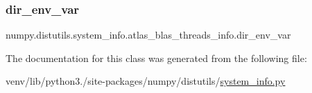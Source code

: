 \subsubsection{\texorpdfstring{dir\+\_\+env\+\_\+var}{dir\_env\_var}}
{\footnotesize\ttfamily numpy.\+distutils.\+system\+\_\+info.\+atlas\+\_\+blas\+\_\+threads\+\_\+info.\+dir\+\_\+env\+\_\+var\hspace{0.3cm}{\ttfamily [static]}}



The documentation for this class was generated from the following file\+:\begin{DoxyCompactItemize}
\item 
venv/lib/python3./site-\/packages/numpy/distutils/\hyperlink{system__info_8py}{system\+\_\+info.\+py}\end{DoxyCompactItemize}
